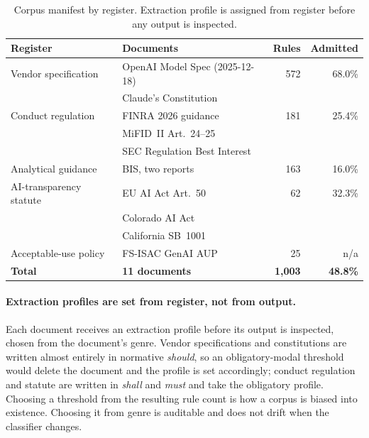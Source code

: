 \documentclass{article}
\begin{document}
\begin{table}[h]
\centering
\small
\setlength{\tabcolsep}{5pt}
\caption{Corpus manifest by register. Extraction profile is assigned from register before any
output is inspected.}
\label{tab:manifest}
\begin{tabular}{@{}llrr@{}}
\toprule
\textbf{Register} & \textbf{Documents} & \textbf{Rules} & \textbf{Admitted} \\
\midrule
Vendor specification & OpenAI Model Spec (2025-12-18) & 572 & 68.0\% \\
                     & Claude's Constitution & & \\
Conduct regulation & FINRA 2026 guidance & 181 & 25.4\% \\
                   & MiFID~II Art.~24--25 & & \\
                   & SEC Regulation Best Interest & & \\
Analytical guidance & BIS, two reports & 163 & 16.0\% \\
AI-transparency statute & EU AI Act Art.~50 & 62 & 32.3\% \\
                        & Colorado AI Act & & \\
                        & California SB~1001 & & \\
Acceptable-use policy & FS-ISAC GenAI AUP & 25 & n/a \\
\midrule
\textbf{Total} & \textbf{11 documents} & \textbf{1{,}003} & \textbf{48.8\%} \\
\bottomrule
\end{tabular}
\end{table}

\paragraph{Extraction profiles are set from register, not from output.}
Each document receives an extraction profile before its output is inspected, chosen from the
document's genre. Vendor specifications and constitutions are written almost entirely in
normative \emph{should}, so an obligatory-modal threshold would delete the document and the
profile is set accordingly; conduct regulation and statute are written in \emph{shall} and
\emph{must} and take the obligatory profile. Choosing a threshold from the resulting rule count
is how a corpus is biased into existence. Choosing it from genre is auditable and does not drift
when the classifier changes.
\end{document}
